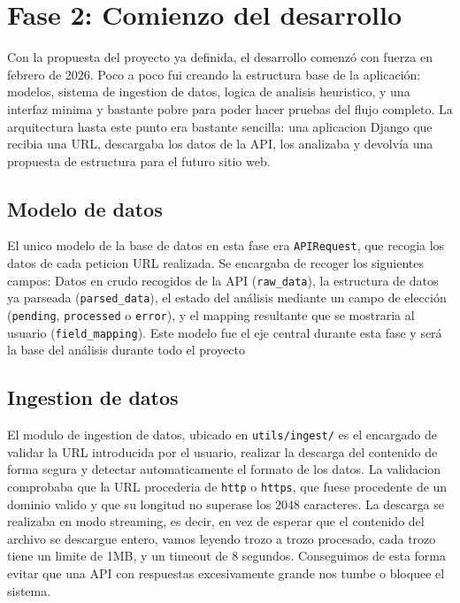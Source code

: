 \section{Fase 2: Comienzo del desarrollo}
\label{sec:comienzo-desarrollo}

Con la propuesta del proyecto ya definida, el desarrollo comenzó con fuerza en febrero de 2026. Poco a poco fui creando la estructura base de 
la aplicación: modelos, sistema de ingestion de datos, logica de analisis heuristico, y una interfaz minima y bastante pobre para poder hacer
pruebas del flujo completo. La arquitectura hasta este punto era bastante sencilla: una aplicacion Django que recibia una URL, descargaba los 
datos de la API, los analizaba y devolvía una propuesta de estructura para el futuro sitio web.

\subsection{Modelo de datos}
\label{subsec:modelo-datos}

El unico modelo de la base de datos en esta fase era \texttt{APIRequest}, que recogia los datos de cada peticion URL realizada.
Se encargaba de recoger los siguientes campos: Datos en crudo recogidos de la API (\texttt{raw\_data}), la estructura de datos ya parseada (\texttt{parsed\_data}),
el estado del análisis mediante un campo de elección (\texttt{pending}, \texttt{processed} o \texttt{error}), y el mapping resultante que se mostraria al usuario
(\texttt{field\_mapping}). Este modelo fue el eje central durante esta fase y será la base del análisis durante todo el proyecto

\subsection{Ingestion de datos}
\label{subsec:ingestion-datos}

El modulo de ingestion de datos, ubicado en \texttt{utils/ingest/} es el encargado de validar la URL introducida por el usuario, realizar la descarga del contenido
de forma segura y detectar automaticamente el formato de los datos. La validacion comprobaba que la URL procederia de \texttt{http} o \texttt{https}, que fuese
procedente de un dominio valido y que su longitud no superase los 2048 caracteres. La descarga se realizaba en modo streaming, es decir, en vez de esperar que
el contenido del archivo se descargue entero, vamos leyendo trozo a trozo procesado, cada trozo tiene un limite de 1MB, y un timeout de 8 segundos. Conseguimos de 
esta forma evitar que una API con respuestas excesivamente grande nos tumbe o bloquee el sistema.

